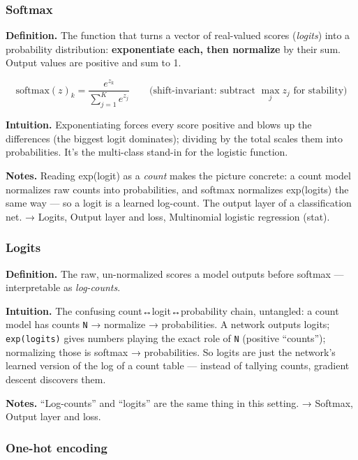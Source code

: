 \documentclass[
  10pt,
  letterpaper,
  onecolumn]{article}
\begin{document}
\hypertarget{softmax}{%
\subsubsection{Softmax}\label{softmax}}

\textbf{Definition.} The function that turns a vector of real-valued
scores (\emph{logits}) into a probability distribution:
\textbf{exponentiate each, then normalize} by their sum. Output values
are positive and sum to 1.

\begin{equation*}
\mathrm{softmax}(z)_k=\frac{e^{z_k}}{\sum_{j=1}^{K}e^{z_j}}
\qquad\text{(shift-invariant: subtract }\max_j z_j\text{ for stability)}
\end{equation*}

\textbf{Intuition.} Exponentiating forces every score positive and blows
up the differences (the biggest logit dominates); dividing by the total
scales them into probabilities. It's the multi-class stand-in for the
logistic function.

\textbf{Notes.} Reading exp(logit) as a \emph{count} makes the picture
concrete: a count model normalizes raw counts into probabilities, and
softmax normalizes exp(logits) the same way --- so a logit is a learned
log-count. The output layer of a classification net. → Logits, Output
layer and loss, Multinomial logistic regression (stat).

\hypertarget{logits}{%
\subsubsection{Logits}\label{logits}}

\textbf{Definition.} The raw, un-normalized scores a model outputs
before softmax --- interpretable as \emph{log-counts}.

\textbf{Intuition.} The confusing count↔logit↔probability chain,
untangled: a count model has counts \texttt{N} → normalize →
probabilities. A network outputs logits; \texttt{exp(logits)} gives
numbers playing the exact role of \texttt{N} (positive ``counts'');
normalizing those is softmax → probabilities. So logits are just the
network's learned version of the log of a count table --- instead of
tallying counts, gradient descent discovers them.

\textbf{Notes.} ``Log-counts'' and ``logits'' are the same thing in this
setting. → Softmax, Output layer and loss.

\hypertarget{one-hot-encoding}{%
\subsubsection{One-hot encoding}\label{one-hot-encoding}}
\end{document}
